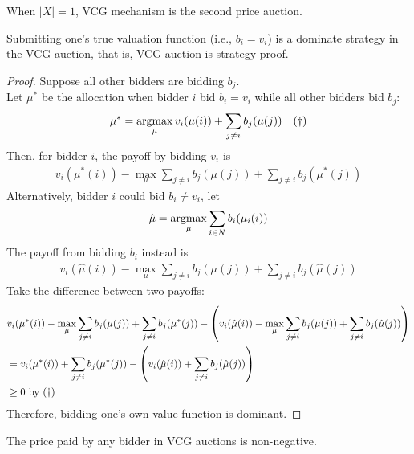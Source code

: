 \documentclass{article}
\begin{document}
	\begin{remark}
		When $|X| = 1$, VCG mechanism is the second price auction.
	\end{remark}
	
	\begin{proposition}
		Submitting one's true valuation function (i.e., $b_i = v_i$) is a dominate strategy in the VCG auction, that is, VCG auction is strategy proof.
	\end{proposition}
	
	\begin{proof}
		Suppose all other bidders are bidding $b_j$. \\
		Let $\mu^*$ be the allocation when bidder $i$ bid $b_i = v_i$ while all other bidders bid $b_j$:
		\begin{align}
			\mu^* = \operatorname*{argmax}_\mu v_i(\mu(i)) + \sum_{j\neq i} b_j(\mu(j))\quad (\dagger)
		\end{align}
		Then, for bidder $i$, the payoff by bidding $v_i$ is
		\begin{align}
			v_i(\mu^*(i)) - \max_\mu \sum_{j \neq i} b_j(\mu(j)) + \sum_{j \neq i}b_j(\mu^*(j))
		\end{align}
		Alternatively, bidder $i$ could bid $b_i \neq v_i$, let
		\begin{align}
			\hat{\mu} = \operatorname*{argmax}_\mu \sum_{i \in N} b_i(\mu_i(i))
		\end{align}
		The payoff from bidding $b_i$ instead is
		\begin{align}
			v_i(\hat{\mu}(i)) -  \max_\mu \sum_{j \neq i} b_j(\mu(j)) + \sum_{j \neq i}b_j(\hat{\mu}(j))
		\end{align}
		Take the difference between two payoffs:
		\begin{align}
			&v_i(\mu^*(i)) - \max_\mu \sum_{j \neq i} b_j(\mu(j)) + \sum_{j \neq i}b_j(\mu^*(j))
			- \left(
			v_i(\hat{\mu}(i)) -  \max_\mu \sum_{j \neq i} b_j(\mu(j)) + \sum_{j \neq i}b_j(\hat{\mu}(j))
			\right) \\
			&= v_i(\mu^*(i)) + \sum_{j \neq i}b_j(\mu^*(j)) - \left(v_i(\hat{\mu}(i)) + \sum_{j \neq i}b_j(\hat{\mu}(j))
			\right) \\
			&\geq 0 \text{{ by }} (\dagger)
		\end{align}
		Therefore, bidding one's own value function is dominant.
	\end{proof}
	
	\begin{proposition}
		The price paid by any bidder in VCG auctions is non-negative.
	\end{proposition}
	
\end{document}
